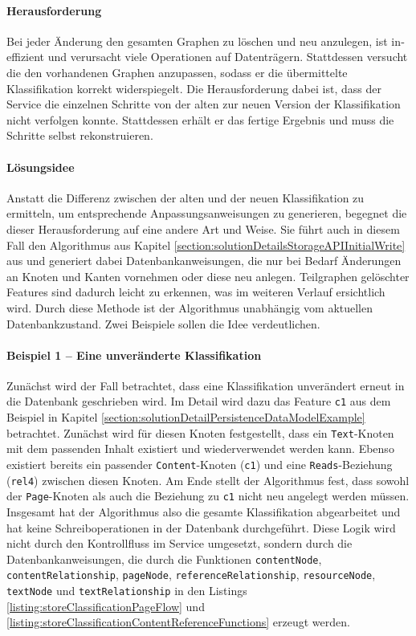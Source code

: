    \paragraph{Herausforderung}
    Bei jeder Änderung den gesamten Graphen zu löschen und neu anzulegen,
    ist in­ef­fi­zi­ent und verursacht viele Operationen auf Datenträgern.
    Stattdessen versucht die {\classificationStorageAPI} den vorhandenen Graphen anzupassen,
    sodass er die übermittelte Klassifikation korrekt widerspiegelt.
    Die Herausforderung dabei ist, dass der Service
    die einzelnen Schritte von der alten zur neuen Version der Klassifikation nicht verfolgen konnte.
    Stattdessen erhält er das fertige Ergebnis und muss die Schritte selbst rekonstruieren.

    \paragraph{Lösungsidee}
    Anstatt die Differenz zwischen der alten und der neuen Klassifikation zu ermitteln,
    um entsprechende Anpassungsanweisungen zu generieren,
    begegnet die {\classificationStorageAPI} dieser Herausforderung auf eine andere Art und Weise.
    Sie führt auch in diesem Fall den Algorithmus aus Kapitel \ref{section:solutionDetailsStorageAPIInitialWrite}
    aus und generiert dabei Datenbankanweisungen,
    die nur bei Bedarf Änderungen an Knoten und Kanten vornehmen oder diese neu anlegen.
    Teilgraphen gelöschter Features sind dadurch leicht zu erkennen,
    was im weiteren Verlauf ersichtlich wird.
    Durch diese Methode ist der Algorithmus unabhängig vom aktuellen Datenbankzustand.
    Zwei Beispiele sollen die Idee verdeutlichen.

    \paragraph{Beispiel 1 -- Eine unveränderte Klassifikation}
    Zunächst wird der Fall betrachtet, dass eine Klassifikation unverändert erneut in die Datenbank geschrieben wird.
    Im Detail wird dazu das Feature \texttt{c1} aus dem Beispiel in Kapitel
    \ref{section:solutionDetailPersistenceDataModelExample} betrachtet.
    Zunächst wird für diesen Knoten festgestellt,
    dass ein \texttt{Text}-Knoten mit dem passenden Inhalt existiert und wiederverwendet werden kann.
    Ebenso existiert bereits ein passender \texttt{Content}-Knoten (\texttt{c1}) und eine \texttt{Reads}-Beziehung (\texttt{rel4}) zwischen diesen Knoten.
    Am Ende stellt der Algorithmus fest, dass sowohl der \texttt{Page}-Knoten als auch
    die Beziehung zu \texttt{c1} nicht neu angelegt werden müssen.
    Insgesamt hat der Algorithmus also die gesamte Klassifikation abgearbeitet
    und hat keine Schreiboperationen in der Datenbank durchgeführt.
    Diese Logik wird nicht durch den Kontrollfluss im Service umgesetzt,
    sondern durch die Datenbankanweisungen, die durch die Funktionen
    \texttt{contentNode},
    \texttt{contentRelationship},
    \texttt{pageNode},
    \texttt{referenceRelationship},
    \texttt{resourceNode},
    \texttt{textNode} und
    \texttt{textRelationship} in den Listings
    \ref{listing:storeClassificationPageFlow} und
    \ref{listing:storeClassificationContentReferenceFunctions}
    erzeugt werden.

